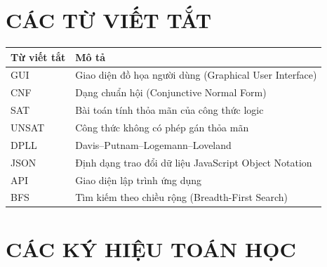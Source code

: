 \chapter*{\MakeUppercase{Các từ viết tắt}}

\begin{longtable}{p{} p{}}
\toprule
\textbf{Từ viết tắt} & \textbf{Mô tả} \\
\midrule
GUI & Giao diện đồ họa người dùng (Graphical User Interface) \\
CNF & Dạng chuẩn hội (Conjunctive Normal Form) \\
SAT & Bài toán tính thỏa mãn của công thức logic \\
UNSAT & Công thức không có phép gán thỏa mãn \\
DPLL & Davis--Putnam--Logemann--Loveland \\
JSON & Định dạng trao đổi dữ liệu JavaScript Object Notation \\
API & Giao diện lập trình ứng dụng \\
BFS & Tìm kiếm theo chiều rộng (Breadth-First Search) \\
\bottomrule
\end{longtable}



\chapter*{\MakeUppercase{Các ký hiệu toán học}}


